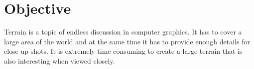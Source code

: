 \documentclass[journal, letterpaper]{IEEEtran}
\begin{document}


\section{Objective}
Terrain is a topic of endless discussion in computer graphics. It has to cover a large area of the world and at the same time it has to provide enough details for close-up shots.
It is extremely time consuming to create a large terrain that is also interesting when viewed closely. 
\end{document}

